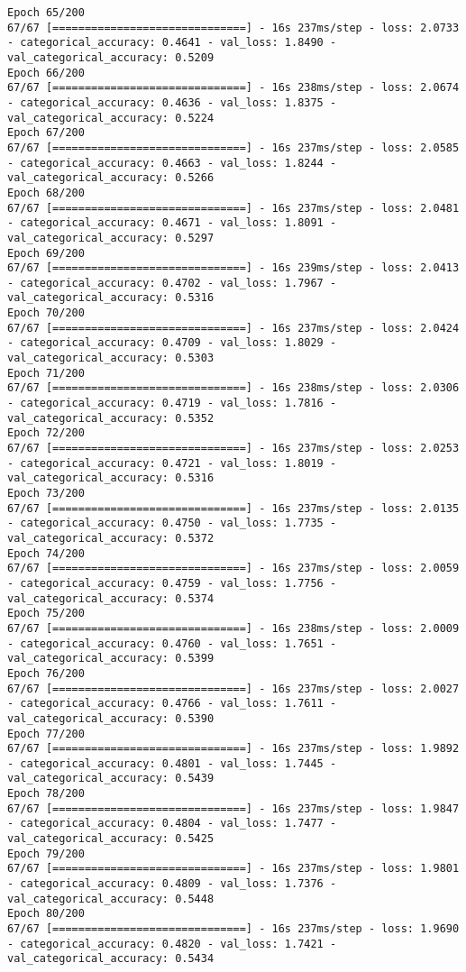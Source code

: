 \begin{lstlisting}
Epoch 65/200
67/67 [==============================] - 16s 237ms/step - loss: 2.0733 - categorical_accuracy: 0.4641 - val_loss: 1.8490 - val_categorical_accuracy: 0.5209
Epoch 66/200
67/67 [==============================] - 16s 238ms/step - loss: 2.0674 - categorical_accuracy: 0.4636 - val_loss: 1.8375 - val_categorical_accuracy: 0.5224
Epoch 67/200
67/67 [==============================] - 16s 237ms/step - loss: 2.0585 - categorical_accuracy: 0.4663 - val_loss: 1.8244 - val_categorical_accuracy: 0.5266
Epoch 68/200
67/67 [==============================] - 16s 237ms/step - loss: 2.0481 - categorical_accuracy: 0.4671 - val_loss: 1.8091 - val_categorical_accuracy: 0.5297
Epoch 69/200
67/67 [==============================] - 16s 239ms/step - loss: 2.0413 - categorical_accuracy: 0.4702 - val_loss: 1.7967 - val_categorical_accuracy: 0.5316
Epoch 70/200
67/67 [==============================] - 16s 237ms/step - loss: 2.0424 - categorical_accuracy: 0.4709 - val_loss: 1.8029 - val_categorical_accuracy: 0.5303
Epoch 71/200
67/67 [==============================] - 16s 238ms/step - loss: 2.0306 - categorical_accuracy: 0.4719 - val_loss: 1.7816 - val_categorical_accuracy: 0.5352
Epoch 72/200
67/67 [==============================] - 16s 237ms/step - loss: 2.0253 - categorical_accuracy: 0.4721 - val_loss: 1.8019 - val_categorical_accuracy: 0.5316
Epoch 73/200
67/67 [==============================] - 16s 237ms/step - loss: 2.0135 - categorical_accuracy: 0.4750 - val_loss: 1.7735 - val_categorical_accuracy: 0.5372
Epoch 74/200
67/67 [==============================] - 16s 237ms/step - loss: 2.0059 - categorical_accuracy: 0.4759 - val_loss: 1.7756 - val_categorical_accuracy: 0.5374
Epoch 75/200
67/67 [==============================] - 16s 238ms/step - loss: 2.0009 - categorical_accuracy: 0.4760 - val_loss: 1.7651 - val_categorical_accuracy: 0.5399
Epoch 76/200
67/67 [==============================] - 16s 237ms/step - loss: 2.0027 - categorical_accuracy: 0.4766 - val_loss: 1.7611 - val_categorical_accuracy: 0.5390
Epoch 77/200
67/67 [==============================] - 16s 237ms/step - loss: 1.9892 - categorical_accuracy: 0.4801 - val_loss: 1.7445 - val_categorical_accuracy: 0.5439
Epoch 78/200
67/67 [==============================] - 16s 237ms/step - loss: 1.9847 - categorical_accuracy: 0.4804 - val_loss: 1.7477 - val_categorical_accuracy: 0.5425
Epoch 79/200
67/67 [==============================] - 16s 237ms/step - loss: 1.9801 - categorical_accuracy: 0.4809 - val_loss: 1.7376 - val_categorical_accuracy: 0.5448
Epoch 80/200
67/67 [==============================] - 16s 237ms/step - loss: 1.9690 - categorical_accuracy: 0.4820 - val_loss: 1.7421 - val_categorical_accuracy: 0.5434

\end{lstlisting}
